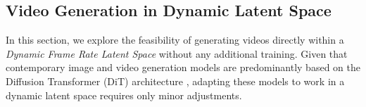 
\subsection{Video Generation in Dynamic Latent Space}





In this section, we explore the feasibility of generating videos directly within a \textit{Dynamic Frame Rate Latent Space} without any additional training. Given that contemporary image and video generation models are predominantly based on the Diffusion Transformer (DiT) architecture \cite{peebles2023scalable,esser2024scaling}, adapting these models to work in a dynamic latent space requires only minor adjustments. 



